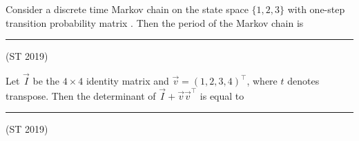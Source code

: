 \item Consider a discrete time Markov chain on the state space \(\{1,2,3\}\) with one-step transition probability matrix
.
Then the period of the Markov chain is \rule{1cm}{0.01pt} \hfill(ST 2019)
\item Let \(\vec{I}\) be the \(4 \times 4\) identity matrix and \(\vec{v} = (1, 2, 3, 4)^{\top}\), where \(t\) denotes transpose. Then the determinant of $\vec{I} + \vec{v} \vec{v}^{\top}$
is equal to \rule{1cm}{0.01pt} \hfill(ST 2019)







